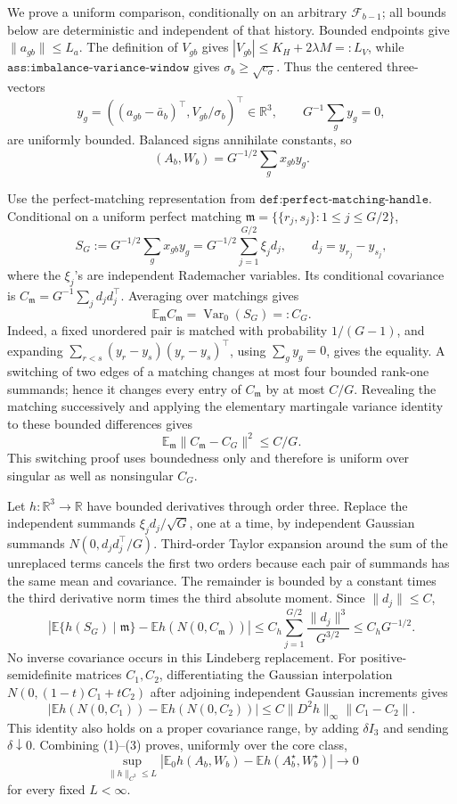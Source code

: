 We prove a uniform comparison, conditionally on an arbitrary \(\mathcal F_{b-1}\); all bounds below are deterministic and independent of that history.  Bounded endpoints give \(\|a_{gb}\|\leq L_a\).  The definition of \(V_{gb}\) gives \(|V_{gb}|\leq K_H+2\lambda M=:L_V\), while \(\texttt{ass:imbalance-variance-window}\) gives \(\sigma_b\geq\sqrt{c_\sigma}\).  Thus the centered three-vectors
\[
 y_g=\left((a_{gb}-\bar a_b)^\top,V_{gb}/\sigma_b\right)^\top\in\mathbb R^3,
 \qquad G^{-1}\sum_gy_g=0,
\]
are uniformly bounded.  Balanced signs annihilate constants, so
\[
 (A_b,W_b)=G^{-1/2}\sum_gx_{gb}y_g.
\]

Use the perfect-matching representation from \(\texttt{def:perfect-matching-handle}\).  Conditional on a uniform perfect matching \(\mathfrak m=\{\{r_j,s_j\}:1\leq j\leq G/2\}\),
\[
 S_G:=G^{-1/2}\sum_gx_{gb}y_g
 =G^{-1/2}\sum_{j=1}^{G/2}\xi_jd_j,
 \qquad d_j=y_{r_j}-y_{s_j},
\]
where the \(\xi_j\)'s are independent Rademacher variables.  Its conditional covariance is
\(C_{\mathfrak m}=G^{-1}\sum_jd_jd_j^\top\).  Averaging over matchings gives
\[
 \mathbb E_{\mathfrak m}C_{\mathfrak m}
 =\operatorname{Var}_0(S_G)=:C_G.
\]
Indeed, a fixed unordered pair is matched with probability \(1/(G-1)\), and expanding \(\sum_{r<s}(y_r-y_s)(y_r-y_s)^\top\), using \(\sum_gy_g=0\), gives the equality.  A switching of two edges of a matching changes at most four bounded rank-one summands; hence it changes every entry of \(C_{\mathfrak m}\) by at most \(C/G\).  Revealing the matching successively and applying the elementary martingale variance identity to these bounded differences gives
\[
 \mathbb E_{\mathfrak m}\|C_{\mathfrak m}-C_G\|^2\leq C/G. \tag{1}
\]
This switching proof uses boundedness only and therefore is uniform over singular as well as nonsingular \(C_G\).

Let \(h:\mathbb R^3\to\mathbb R\) have bounded derivatives through order three.  Replace the independent summands \(\xi_jd_j/\sqrt G\), one at a time, by independent Gaussian summands \(N(0,d_jd_j^\top/G)\).  Third-order Taylor expansion around the sum of the unreplaced terms cancels the first two orders because each pair of summands has the same mean and covariance.  The remainder is bounded by a constant times the third derivative norm times the third absolute moment.  Since \(\|d_j\|\leq C\),
\[
 \left|\mathbb E\{h(S_G)\mid\mathfrak m\}
       -\mathbb Eh(N(0,C_{\mathfrak m}))\right|
 \leq C_h\sum_{j=1}^{G/2}\frac{\|d_j\|^3}{G^{3/2}}
 \leq C_hG^{-1/2}. \tag{2}
\]
No inverse covariance occurs in this Lindeberg replacement.  For positive-semidefinite matrices \(C_1,C_2\), differentiating the Gaussian interpolation \(N(0,(1-t)C_1+tC_2)\) after adjoining independent Gaussian increments gives
\[
 |\mathbb Eh(N(0,C_1))-\mathbb Eh(N(0,C_2))|
 \leq C\|D^2h\|_\infty\|C_1-C_2\|. \tag{3}
\]
This identity also holds on a proper covariance range, by adding \(\delta I_3\) and sending \(\delta\downarrow0\).  Combining (1)--(3) proves, uniformly over the core class,
\[
 \sup_{\|h\|_{C^3}\leq L}
 \left|\mathbb E_0h(A_b,W_b)-\mathbb Eh(A_b^\star,W_b^\star)\right|
 \longrightarrow0                                                   \tag{4}
\]
for every fixed \(L<\infty\).

